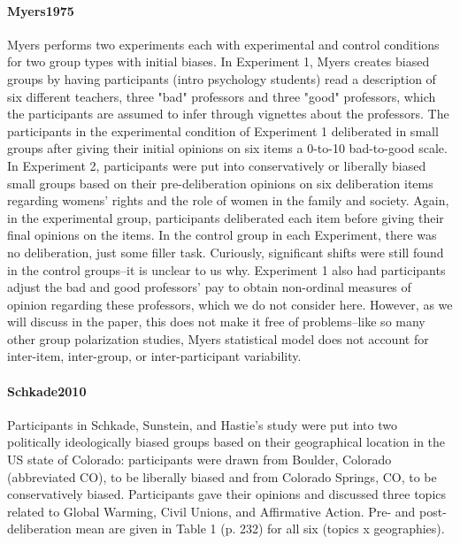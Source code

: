 \documentclass[11pt, letterpaper]{article}
\begin{document}
\paragraph{{Myers1975}} Myers performs two experiments each with experimental and control conditions for two group types with initial biases. In Experiment 1, Myers creates biased groups by having participants (intro psychology students) read a description of six different teachers, three "bad" professors and three "good" professors, which the participants are assumed to infer through vignettes about the professors. The participants in the experimental condition of Experiment 1 deliberated in small groups after giving their initial opinions on six items a 0-to-10 bad-to-good scale. In Experiment 2, participants were put into conservatively or liberally biased small groups based on their pre-deliberation opinions on six deliberation items regarding womens' rights and the role of women in the family and society. Again, in the experimental group, participants deliberated each item before giving their final opinions on the items. In the control group in each Experiment, there was no deliberation, just some filler task. Curiously, significant shifts were still found in the control groups--it is unclear to us why. Experiment 1 also had participants adjust the bad and good professors' pay to obtain non-ordinal measures of opinion regarding these professors, which we do not consider here. However, as we will discuss in the paper, this does not make it free of problems--like so many other group polarization studies, Myers statistical model does not account for inter-item, inter-group, or inter-participant variability.

\paragraph{{Schkade2010}} Participants in Schkade, Sunstein, and Hastie's study were put into two politically ideologically biased groups based on their geographical location in the US state of Colorado: participants were drawn from Boulder, Colorado (abbreviated CO), to be liberally biased and from Colorado Springs, CO, to be conservatively biased. Participants gave their opinions and discussed three topics related to Global Warming, Civil Unions, and Affirmative Action. Pre- and post-deliberation mean are given in Table 1 (p. 232) for all six (topics x geographies).  
\end{document}
